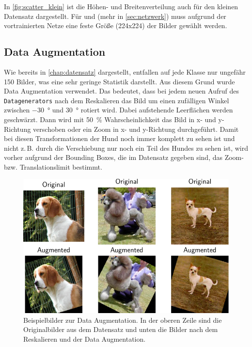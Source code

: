 In \autoref{fig:scatter_klein} ist die Höhen- und Breitenverteilung auch für
den kleinen Datensatz dargestellt.
Für \PreDog{} und \PreBig{} (mehr in \autoref{sec:netzwerk}) muss aufgrund der
vortrainierten Netze eine feste Größe (224x224) der Bilder gewählt werden.

\subsection{Data Augmentation}
Wie bereits in \autoref{chap:datensatz} dargestellt, entfallen auf jede Klasse
nur ungefähr 150 Bilder, was eine sehr geringe Statistik darstellt. Aus diesem
Grund wurde Data Augmentation verwendet. Das bedeutet, dass bei jedem neuen
Aufruf des \texttt{Datagenerators} nach dem Reskalieren das Bild um einen zufälligen
Winkel zwischen \SI{-30}{\degree} und \SI{30}{\degree} rotiert wird. Dabei
aufstehende Leerflächen werden geschwärzt. Dann wird mit \SI{50}{\percent}
Wahrscheinlichkeit das Bild in x- und y-Richtung verschoben oder ein Zoom in x-
und y-Richtung durchgeführt. Damit bei diesen Transformationen der Hund noch
immer komplett zu sehen ist und nicht z.\,B. durch die Verschiebung nur noch ein
Teil des Hundes zu sehen ist, wird vorher aufgrund der Bounding Boxes, die im
Datensatz gegeben sind, das Zoom- bzw. Translationslimit bestimmt.

\begin{figure}
  \centering
  \includegraphics[scale=0.8]{pics/subplot.pdf}
  \caption{Beispielbilder zur Data Augmentation. In der oberen Zeile sind die
  Originalbilder aus dem Datensatz und unten die Bilder nach dem Reskalieren und der Data Augmentation.}
  \label{fig:data_augmentation}
\end{figure}

